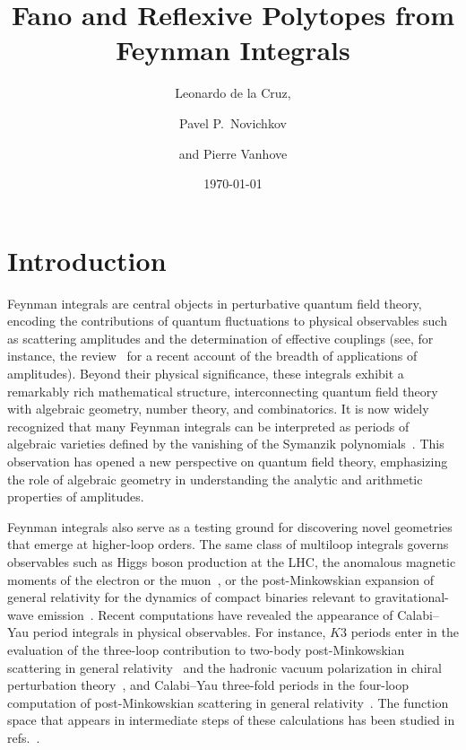 \documentclass[12pt,a4paper]{article}
\title{Fano and Reflexive Polytopes from Feynman Integrals} %
\author[a]{Leonardo de la Cruz,}
\affiliation[a]{Institut de Physique Th\'eorique, Université Paris-Saclay, CEA, CNRS, F-91191 Gif-sur-
	Yvette Cedex, France}
\author[b]{Pavel P.~Novichkov}
\affiliation[b]{Department of Physics and Astronomy, Ghent University, 9000 Ghent, Belgium}
\author[a]{and Pierre Vanhove}
\date{\today}
\theoremstyle{plain}
\theoremstyle{remark}
\begin{document}
	\maketitle
	
	
	
	
	\section{Introduction}

Feynman integrals are central objects in perturbative quantum field
theory, encoding the contributions of quantum fluctuations to physical
observables such as scattering amplitudes and the determination of effective
couplings (see, for instance, the review~\cite{Travaglini:2022uwo} for a
recent account of the breadth of applications of amplitudes).
Beyond their physical significance, these integrals exhibit
a remarkably rich mathematical structure, interconnecting quantum
field theory with algebraic geometry, number theory, and
combinatorics. It is now widely recognized that
many Feynman integrals can be interpreted as periods of
algebraic varieties defined by the vanishing of the Symanzik
polynomials~\cite{Bloch:2005bh,Bogner:2007mn,Brown:2009ta, Schnetz:2013hqa}. This
observation has opened a new perspective on quantum field theory,
emphasizing the role of algebraic geometry in understanding the
analytic and arithmetic properties of amplitudes. 

Feynman
integrals also serve as a testing ground for discovering novel
geometries that emerge at higher-loop orders. The same class of
multiloop integrals governs observables such as Higgs boson
production at the LHC,  the anomalous magnetic moments of the
electron or the muon~\cite{Laporta:2017okg, Blum:2023qou}, or the
post-Minkowskian expansion of general relativity for the dynamics of
compact binaries relevant to gravitational-wave
emission~\cite{Bjerrum-Bohr:2022blt}. Recent computations have
revealed the appearance of Calabi--Yau period integrals in physical
observables. For instance, $K3$ periods enter in the evaluation of the
three-loop contribution to two-body post-Minkowskian scattering in
general relativity~\cite{Bern:2021dqo,Bern:2021yeh,Dlapa:2021npj,Dlapa:2022lmu,Bjerrum-Bohr:2022ows} and the hadronic vacuum polarization in chiral
perturbation theory~\cite{Lellouch:2025rnz}, and Calabi--Yau three-fold periods in the four-loop
computation of post-Minkowskian scattering in
general relativity~\cite{Klemm:2024wtd,Driesse:2024feo}. The function space that appears in intermediate steps of these calculations has been studied in refs.~\cite{Frellesvig:2023bbf, Brammer:2025rqo}.
\end{document}
